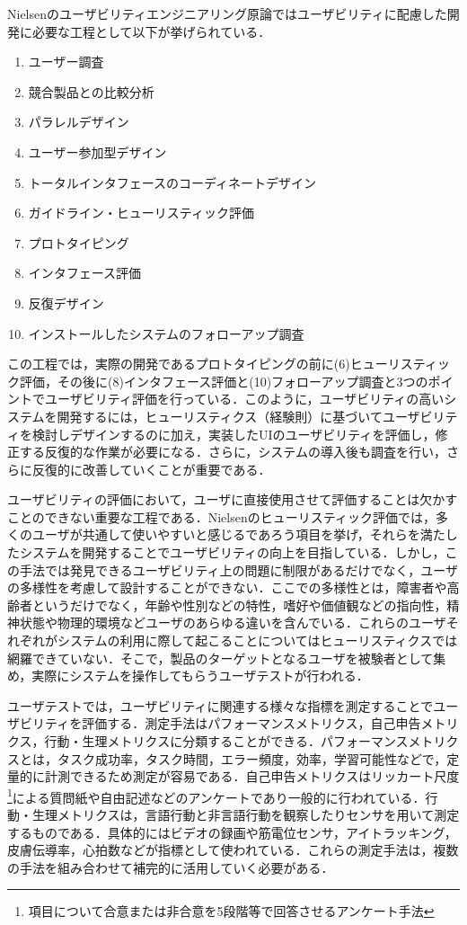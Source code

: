 Nielsenのユーザビリティエンジニアリング原論ではユーザビリティに配慮した開発に必要な工程として以下が挙げられている\cite{nielsen2002}．
\begin{enumerate}
\setlength{\parskip}{0cm}
  \setlength{\itemsep}{0cm}
  \item ユーザー調査
  \item 競合製品との比較分析
  \item パラレルデザイン
  \item ユーザー参加型デザイン
  \item トータルインタフェースのコーディネートデザイン
  \item ガイドライン・ヒューリスティック評価
  \item プロトタイピング
  \item インタフェース評価
  \item 反復デザイン
  \item インストールしたシステムのフォローアップ調査
\end{enumerate}

この工程では，実際の開発であるプロトタイピングの前に(6)ヒューリスティック評価，その後に(8)インタフェース評価と(10)フォローアップ調査と3つのポイントでユーザビリティ評価を行っている．このように，ユーザビリティの高いシステムを開発するには，ヒューリスティクス（経験則）に基づいてユーザビリティを検討しデザインするのに加え，実装したUIのユーザビリティを評価し，修正する反復的な作業が必要になる．さらに，システムの導入後も調査を行い，さらに反復的に改善していくことが重要である．

ユーザビリティの評価において，ユーザに直接使用させて評価することは欠かすことのできない重要な工程である．Nielsenのヒューリスティック評価\cite{nielsen1990}では，多くのユーザが共通して使いやすいと感じるであろう項目を挙げ，それらを満たしたシステムを開発することでユーザビリティの向上を目指している．しかし，この手法では発見できるユーザビリティ上の問題に制限があるだけでなく，ユーザの多様性を考慮して設計することができない．ここでの多様性とは，障害者や高齢者というだけでなく，年齢や性別などの特性，嗜好や価値観などの指向性，精神状態や物理的環境などユーザのあらゆる違いを含んでいる\cite{kurosu2013}．これらのユーザそれぞれがシステムの利用に際して起こることについてはヒューリスティクスでは網羅できていない．そこで，製品のターゲットとなるユーザを被験者として集め，実際にシステムを操作してもらうユーザテストが行われる．

ユーザテストでは，ユーザビリティに関連する様々な指標を測定することでユーザビリティを評価する．測定手法はパフォーマンスメトリクス，自己申告メトリクス，行動・生理メトリクスに分類することができる\cite{tullis2014}．パフォーマンスメトリクスとは，タスク成功率，タスク時間，エラー頻度，効率，学習可能性などで，定量的に計測できるため測定が容易である．自己申告メトリクスはリッカート尺度\footnote{項目について合意または非合意を5段階等で回答させるアンケート手法}による質問紙や自由記述などのアンケートであり一般的に行われている．行動・生理メトリクスは，言語行動と非言語行動を観察したりセンサを用いて測定するものである．具体的にはビデオの録画や筋電位センサ，アイトラッキング，皮膚伝導率，心拍数などが指標として使われている\cite{tullis2014}．これらの測定手法は，複数の手法を組み合わせて補完的に活用していく必要がある．

